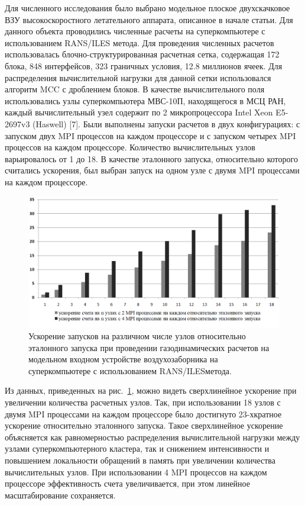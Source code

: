 Для численного исследования было выбрано модельное плоское двухскачковое ВЗУ высокоскоростного летательного аппарата, описанное в начале статьи.
Для данного объекта проводились численные расчеты на суперкомпьютере с использованием RANS/ILES метода.
Для проведения численных расчетов использовалась блочно-структурированная расчетная сетка, содержащая 172 блока, 848 интерфейсов, 323 граничных условия, 12.8 миллионов ячеек.
Для распределения вычислительной нагрузки для данной сетки использовался алгоритм MCC с дроблением блоков.
В качестве вычислительного поля использовались узлы суперкомпьютера МВС-10П, находящегося в МСЦ РАН, каждый вычислительный узел содержит по 2 микропроцессора Intel Xeon E5-2697v3 (Haswell) [7]. 
Были выполнены запуски расчетов в двух конфигурациях: с запуском двух MPI процессов на каждом процессоре и с запуском четырех MPI процессов на каждом процессоре.
Количество вычислительных узлов варьировалось от 1 до 18.
В качестве эталонного запуска, относительно которого считались ускорения, был выбран запуск на одном узле с двумя MPI процессами на каждом процессоре. 

\begin{figure}[ht]
	\centering
	\includegraphics[width=1.0\textwidth]{./pics/text_2_withcut/scaling.png}
	\caption{Ускорение запусков на различном числе узлов относительно эталонного запуска при проведении газодинамических расчетов на модельном входном устройстве воздухозаборника на суперкомпьютере с использованием RANS/ILESметода.}
	\label{fig:text_2_withcut_scaling}
\end{figure}

Из данных, приведенных на рис.~\ref{fig:text_2_withcut_scaling}, можно видеть сверхлинейное ускорение при увеличении количества расчетных узлов.
Так, при использовании 18 узлов с двумя MPI процессами на каждом процессоре было достигнуто 23-хкратное ускорение относительно эталонного запуска.
Такое сверхлинейное ускорение объясняется как равномерностью распределения вычислительной нагрузки между узлами суперкомпьютерного кластера, так и снижением интенсивности и повышением локальности обращений в память при увеличении количества вычислительных узлов.
При использовании 4 MPI процессов на каждом процессоре эффективность счета увеличивается, при этом линейное масштабирование сохраняется.

